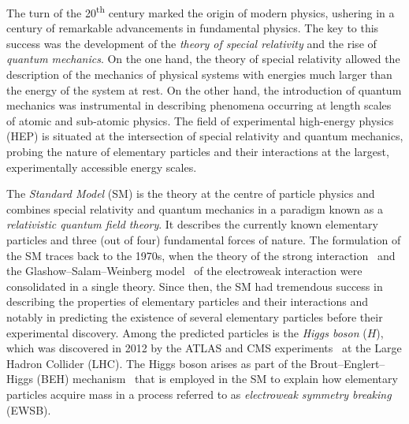 The turn of the 20\textsuperscript{th} century marked the origin of modern
physics, ushering in a century of remarkable advancements in fundamental
physics. The key to this success was the development of the \emph{theory of
  special relativity} and the rise of \emph{quantum mechanics}. On the one hand,
the theory of special relativity
%
allowed the description of the mechanics of physical systems with energies much
larger than the energy of the system at rest. On the other hand, the
introduction of quantum mechanics was instrumental in describing phenomena
occurring at length scales of atomic and sub-atomic physics. The field of
experimental high-energy physics (HEP) is situated at the intersection of
special relativity and quantum mechanics, probing the nature of elementary
particles and their interactions at the largest, experimentally accessible
energy scales.



The \emph{Standard Model} (SM) is the theory at the centre of particle physics
and combines special relativity and quantum mechanics in a paradigm known as a
\emph{relativistic quantum field theory}. It describes the currently known
elementary particles and three (out of four) fundamental forces of nature. The
formulation of the SM traces back to the 1970s, when the theory of the strong
interaction~\cite{Fritzsch:1973pi,Gross:1973id,Politzer:1973fx} and the
Glashow--Salam--Weinberg
model~\cite{Glashow:1961tr,Salam:1964ry,Weinberg:1967tq} of the electroweak
interaction were consolidated in a single theory. Since then, the SM had
tremendous success in describing the properties of elementary particles and
their interactions and notably in predicting the existence of several
elementary particles before their experimental discovery. Among the predicted
particles is the \emph{Higgs boson} ($H$), which was discovered in 2012 by the
ATLAS and CMS experiments~\cite{HIGG-2012-27,CMS-HIG-12-028} at the Large Hadron
Collider (LHC). The Higgs boson arises as part of the Brout--Englert--Higgs
(BEH) mechanism~\cite{Englert:1964et,Higgs:1964pj} that is employed in the SM to
explain how elementary particles acquire mass in a process referred to as
\emph{electroweak symmetry breaking} (EWSB).


